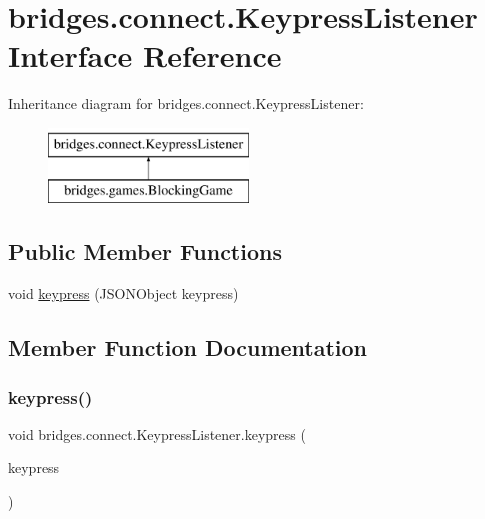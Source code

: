 \hypertarget{interfacebridges_1_1connect_1_1_keypress_listener}{}\section{bridges.\+connect.\+Keypress\+Listener Interface Reference}
\label{interfacebridges_1_1connect_1_1_keypress_listener}
Inheritance diagram for bridges.\+connect.\+Keypress\+Listener\+:\begin{figure}[H]
\begin{center}
\leavevmode
\includegraphics[height=2.000000cm]{interfacebridges_1_1connect_1_1_keypress_listener}
\end{center}
\end{figure}
\subsection*{Public Member Functions}
\begin{DoxyCompactItemize}
\item 
void \mbox{\hyperlink{interfacebridges_1_1connect_1_1_keypress_listener_af713d94f36bce842f39ce0aea4db8da6}{keypress}} (J\+S\+O\+N\+Object keypress)
\end{DoxyCompactItemize}


\subsection{Member Function Documentation}
\mbox{\label{interfacebridges_1_1connect_1_1_keypress_listener_af713d94f36bce842f39ce0aea4db8da6}} 
\subsubsection{\texorpdfstring{keypress()}{keypress()}}
{\footnotesize\ttfamily void bridges.\+connect.\+Keypress\+Listener.\+keypress (\begin{DoxyParamCaption}\item[{J\+S\+O\+N\+Object}]{keypress }\end{DoxyParamCaption})}




